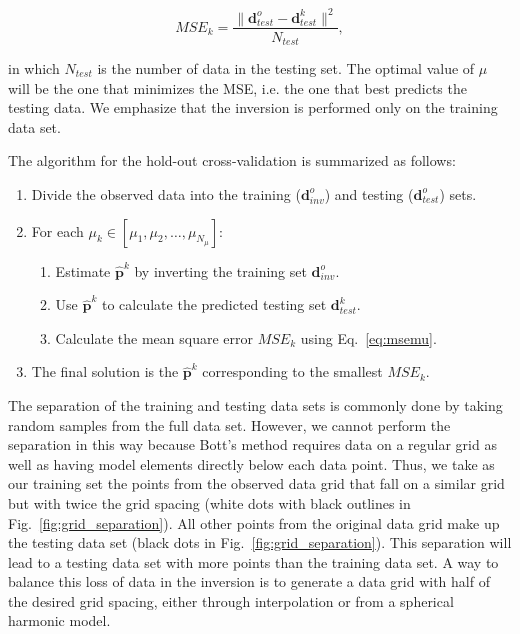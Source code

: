 \documentclass[extra,mreferee]{gji}
\begin{document}
\begin{equation}
    MSE_k = \dfrac{\|\mathbf{d}^o_{test} - \mathbf{d}^k_{test}\|^2}{N_{test}},
    \label{eq:msemu}
\end{equation}

\noindent
in which $N_{test}$ is the number of data in the testing set.
The optimal value of $\mu$ will be the one that minimizes the MSE,
i.e. the one that best predicts the testing data.
We emphasize that the inversion is performed only on the training data set.

The algorithm for the hold-out cross-validation is summarized as follows:

\begin{enumerate}
    \item Divide the observed data into
        the training ($\mathbf{d}^o_{inv}$)
        and testing ($\mathbf{d}^o_{test}$) sets.
    \item For each $\mu_k \in [\mu_1, \mu_2, \ldots, \mu_{N_{\mu}}]$:
    \begin{enumerate}
        \item Estimate $\mathbf{\hat{p}}^k$ by inverting the training set
            $\mathbf{d}^o_{inv}$.
        \item Use $\mathbf{\hat{p}}^k$ to calculate the predicted testing set
            $\mathbf{d}^k_{test}$.
        \item Calculate the mean square error $MSE_k$ using Eq.~\ref{eq:msemu}.
    \end{enumerate}
    \item The final solution is the $\mathbf{\hat{p}}^k$ corresponding to the
        smallest $MSE_k$.
\end{enumerate}

The separation of the training and testing data sets is commonly done by taking
random samples from the full data set.
However, we cannot perform the separation in this way because
Bott's method requires data on a regular grid as well as having model elements
directly below each data point.
Thus, we take as our training set the points from the observed data grid that
fall on a similar grid but with twice the grid spacing
(white dots with black outlines in Fig.~\ref{fig:grid_separation}).
All other points from the original data grid
make up the testing data set
(black dots in Fig.~\ref{fig:grid_separation}).
This separation will lead to
a testing data set with more points than the training data set.
A way to balance this loss of data in the inversion
is to generate a data grid with half of the desired grid spacing,
either through interpolation
or from a spherical harmonic model.
\end{document}
